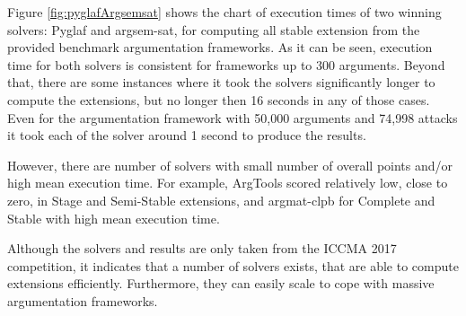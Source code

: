 Figure \ref{fig:pyglafArgsemsat} shows the chart of execution times of two winning solvers: Pyglaf and argsem-sat, for computing all stable extension from the provided benchmark argumentation frameworks. As it can be seen, execution time for both solvers is consistent for frameworks up to 300 arguments. Beyond that, there are some instances where it took the solvers significantly longer to compute the extensions, but no longer then 16 seconds in any of those cases. Even for the argumentation framework with 50,000 arguments and 74,998 attacks it took each of the solver around 1 second to produce the results. 

However, there are number of solvers with small number of overall points and/or high mean execution time. For example, ArgTools \citep{argtools} scored relatively low, close to zero, in Stage and Semi-Stable extensions, and argmat-clpb for Complete and Stable with high mean execution time. 

Although the solvers and results are only taken from the ICCMA 2017 competition, it indicates that a number of solvers exists, that are able to compute extensions efficiently. Furthermore, they can easily scale to cope with massive argumentation frameworks. 